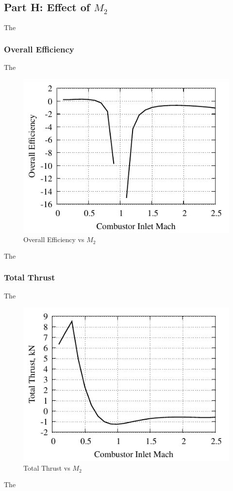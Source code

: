 \documentclass[conf]{new-aiaa} %
\begin{document}
\subsection{Part H: Effect of \texorpdfstring{\textit{$M_2$}}{M2}}
The

\subsubsection{Overall Efficiency}
The

\begin{figure}[hbt!] %
    \centering
    \includegraphics[]{media/performance_parameter_files/part_h_eta_o.pdf}
    \caption{\label{fig:parthetao}Overall Efficiency vs \texorpdfstring{\textit{$M_2$}}{M2}}
\end{figure}
The

\subsubsection{Total Thrust}
The

\begin{figure}[hbt!] %
    \centering
    \includegraphics[]{media/performance_parameter_files/part_h_T.pdf}
    \caption{\label{fig:partht}Total Thrust vs \texorpdfstring{\textit{$M_2$}}{M2}}
\end{figure}
The
\end{document}
